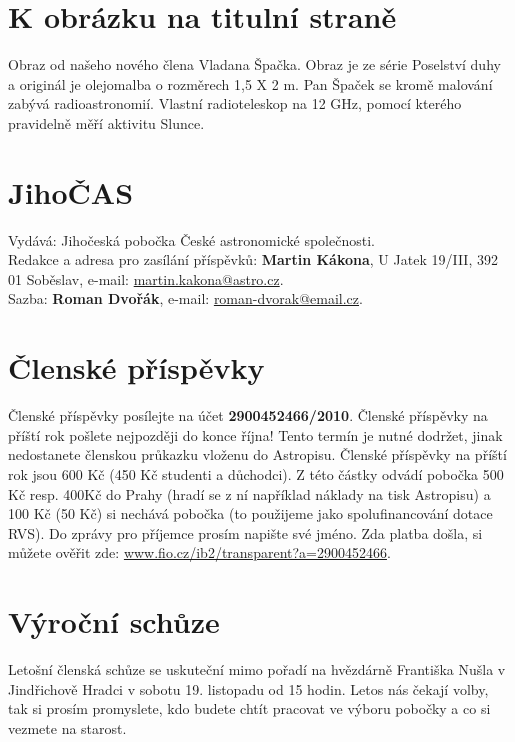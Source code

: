 \documentclass[10pt,a5paper,twoside]{book}
\begin{document}
 

%



\section*{K obrázku na titulní straně}
Obraz od našeho nového člena Vladana Špačka. Obraz je ze série Poselství duhy a originál je olejomalba o rozměrech 1,5 X 2 m.
Pan Špaček se kromě malování zabývá radioastronomií. Vlastní radioteleskop na 12 GHz, pomocí kterého pravidelně měří aktivitu Slunce.

\vfill
\section*{JihoČAS}
Vydává: Jihočeská pobočka České astronomické společnosti.\\
Redakce a adresa pro zasílání příspěvků: \textbf{Martin Kákona}, U Jatek 19/III, 392 01 Soběslav, e-mail: \href{mailto:martin.kakona@astro.cz}{martin.kakona@astro.cz}.\\
Sazba: \textbf{Roman Dvořák}, e-mail: \href{mailto:roman-dvorak@email.cz}{roman-dvorak@email.cz}.\newpage
\null
\vfill

\section*{Členské příspěvky}

Členské příspěvky posílejte na účet \textbf{2900452466/2010}. Členské příspěvky na příští rok pošlete nejpozději do konce října! Tento termín je nutné dodržet, jinak nedostanete členskou průkazku vloženu do Astropisu. Členské příspěvky na příští rok jsou 600 Kč (450 Kč studenti a důchodci). Z této částky odvádí pobočka 500 Kč resp. 400Kč do Prahy (hradí se z ní například náklady na tisk Astropisu) a 100 Kč (50 Kč) si nechává pobočka (to použijeme jako spolufinancování dotace RVS). Do zprávy pro příjemce prosím napište své jméno. Zda platba došla, si můžete ověřit zde: \href{https://www.fio.cz/ib2/transparent?a=2900452466}{www.fio.cz/ib2/transparent?a=2900452466}.

\section*{Výroční schůze}

Letošní členská schůze se uskuteční mimo pořadí na hvězdárně Františka Nušla v Jindřichově Hradci v sobotu 19. listopadu od 15 hodin. Letos nás čekají volby, tak si prosím promyslete, kdo budete chtít pracovat ve výboru pobočky a co si vezmete na starost. 
\end{document}
